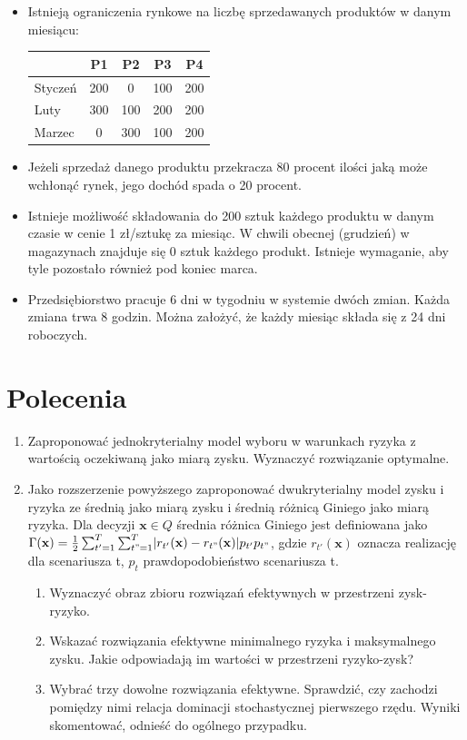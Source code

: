 \documentclass[11pt,a4paper]{article}
\begin{document}
\begin{itemize}
  \item Istnieją ograniczenia rynkowe na liczbę sprzedawanych produktów w danym miesiącu:
  \begin{center}
  \begin{tabular}{l*{4}{c}}
  	\hline
              			& P1 & P2 & P3 & P4 \\
	\hline
	Styczeń 			& 200 & 0 & 100 & 200 \\
	Luty   				& 300 & 100 & 200 & 200 \\
	Marzec 				& 0 & 300 & 100 & 200  \\
	\hline
	\end{tabular}
	\end{center}
	
	\item Jeżeli sprzedaż danego produktu przekracza 80 procent ilości jaką może wchłonąć rynek, jego dochód spada o 20 procent.
	
	\item Istnieje możliwość składowania do 200 sztuk każdego produktu w danym czasie w cenie 1 zł/sztukę za miesiąc. W chwili obecnej (grudzień) w magazynach znajduje się 0 sztuk każdego produkt. Istnieje wymaganie, aby tyle pozostało również pod koniec marca.
	
	\item Przedsiębiorstwo pracuje 6 dni w tygodniu w systemie dwóch zmian. Każda zmiana trwa 8 godzin. Można założyć, że każdy miesiąc składa się z 24 dni roboczych.
\end{itemize}

\section*{Polecenia}
\begin{enumerate}
  \item Zaproponować jednokryterialny model wyboru w warunkach ryzyka z wartością oczekiwaną jako miarą zysku. Wyznaczyć rozwiązanie optymalne.
  \item Jako rozszerzenie powyższego zaproponować dwukryterialny model zysku i ryzyka ze średnią jako miarą zysku i średnią różnicą Giniego jako miarą ryzyka. Dla decyzji $\mathbf{x}\in Q$ średnia różnica Giniego jest definiowana jako $\Gamma(\mathbf{x})=\frac{1}{2}\sum_{t'=1}^{T}\sum_{t"=1}^{T}\lvert r_{t'}(\mathbf{x})-r_{t"}(\mathbf{x})\rvert p_{t'}p_{t"}$, gdzie $r_{t'}(\mathbf{x})$ oznacza realizację dla scenariusza t, $p_{t}$ prawdopodobieństwo scenariusza t.
  \begin{enumerate}
    \item Wyznaczyć obraz zbioru rozwiązań efektywnych w przestrzeni zysk-ryzyko.
    \item Wskazać rozwiązania efektywne minimalnego ryzyka i maksymalnego zysku. Jakie odpowiadają im wartości w przestrzeni ryzyko-zysk?
    \item Wybrać trzy dowolne rozwiązania efektywne. Sprawdzić, czy zachodzi pomiędzy nimi relacja dominacji stochastycznej pierwszego rzędu. Wyniki skomentować, odnieść do ogólnego przypadku.
  \end{enumerate}
\end{enumerate}
\end{document}
